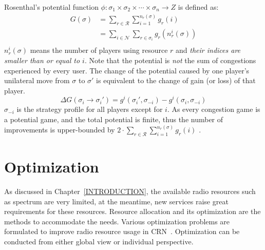 Rosenthal's potential function $\phi:\sigma_1\times\sigma_2\times\cdots\times\sigma_n\rightarrow Z$ is defined as:
\begin{equation}
\label{4}
\begin{split}
G(\sigma) 
& =\sum\limits^{}_{r\in \mathcal{R}} \sum\limits^{n_r(\sigma)}_{i=1} g_r(i)\\
& =\sum\limits_{i\in \mathcal{N}} \sum\limits^{}_{r\in \sigma_i} g_r(n_r^i(\sigma))\\
\end{split}
\end{equation}
$n_r^i(\sigma)$ means the number of players using resource $r$ and \textit{their indices are smaller than or equal to $i$}. 
Note that the potential is \textit{not} the sum of congestions experienced by every user. 
The change of the potential caused by one player's unilateral move from $\sigma$ to $\sigma'$ is equivalent to the change of gain (or loss) of that player.
\begin{equation}
\label{5}
\varDelta G(\sigma_i \rightarrow \sigma_i') = g^i(\sigma_i',\sigma_{-i}) - g^i(\sigma_i,\sigma_{-i})
\end{equation}
$\sigma_{-i}$ is the strategy profile for all players except for $i$.
As every congestion game is a potential game, and the total potential is finite, thus the number of improvements is upper-bounded by $2\cdot\sum\limits^{}_{r\in \mathcal{R}} \sum\limits^{n_r(\sigma)}_{i=1} g_r(i)$ \cite{Voecking06congestiongames}.




\section{Optimization}
As discussed in Chapter~\ref{INTRODUCTION}, the available radio resources such as spectrum are very limited, at the meantime, new services raise great requirements for these resources.
Resource allocation and its optimization are the methods to accommodate the needs.
Various optimization problems are formulated to improve radio resource usage in CRN~\cite{cacao_ca_2011, fuzzy_decision_09, resourceAllocation_imperfectSensing_2012}.
Optimization can be conducted from either global view or individual perspective.

